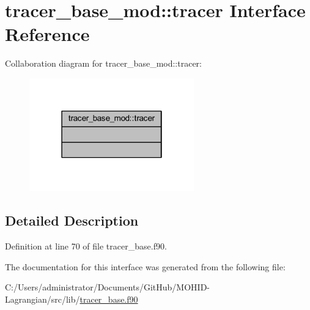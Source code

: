 \hypertarget{interfacetracer__base__mod_1_1tracer}{}\section{tracer\+\_\+base\+\_\+mod\+:\+:tracer Interface Reference}
\label{interfacetracer__base__mod_1_1tracer}


Collaboration diagram for tracer\+\_\+base\+\_\+mod\+:\+:tracer\+:\nopagebreak
\begin{figure}[H]
\begin{center}
\leavevmode
\includegraphics[width=202pt]{interfacetracer__base__mod_1_1tracer__coll__graph}
\end{center}
\end{figure}


\subsection{Detailed Description}


Definition at line 70 of file tracer\+\_\+base.\+f90.



The documentation for this interface was generated from the following file\+:\begin{DoxyCompactItemize}
\item 
C\+:/\+Users/administrator/\+Documents/\+Git\+Hub/\+M\+O\+H\+I\+D-\/\+Lagrangian/src/lib/\mbox{\hyperlink{tracer__base_8f90}{tracer\+\_\+base.\+f90}}\end{DoxyCompactItemize}
